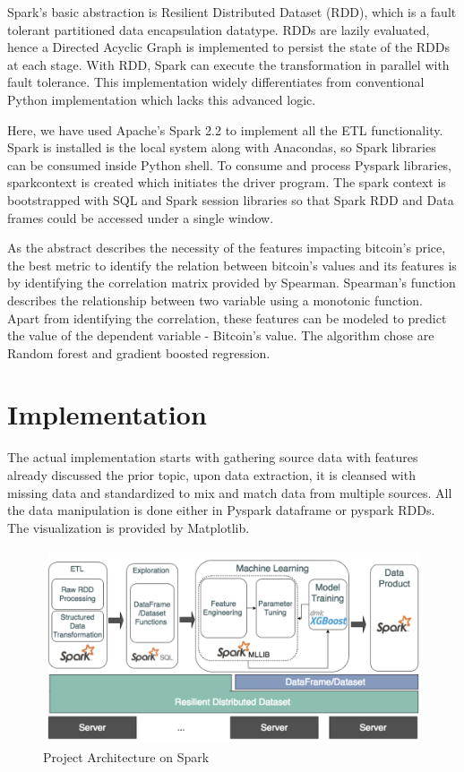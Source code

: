\documentclass[sigconf]{acmart}
\begin{document}
Spark's basic abstraction is Resilient Distributed Dataset (RDD), which is a fault tolerant partitioned data encapsulation datatype. RDDs are lazily evaluated, hence a Directed Acyclic Graph is implemented to persist the state of the RDDs at each stage. With RDD, Spark can execute the transformation in parallel with fault tolerance. This implementation widely differentiates from conventional Python implementation which lacks this advanced logic.  

Here, we have used Apache's Spark 2.2 to implement all the ETL functionality. Spark is installed is the local system along with Anacondas, so Spark libraries can be consumed inside Python shell. To consume and process Pyspark libraries, sparkcontext is created which initiates the driver program. The spark context is bootstrapped with SQL and Spark session libraries so that Spark RDD and Data frames could be accessed under a single window.

As the abstract describes the necessity of the features impacting bitcoin's price, the best metric to identify the relation between bitcoin's values and its features is by identifying the correlation matrix provided by Spearman. Spearman's function describes the relationship between two variable using a monotonic function\cite{Spearman9:online}. Apart from identifying the correlation, these features can be modeled to predict the value of the dependent variable - Bitcoin's value. The algorithm chose are Random forest and gradient boosted regression.

\section{Implementation}
The actual implementation starts with gathering source data with features already discussed the prior topic, upon data extraction, it is cleansed with missing data and standardized to mix and match data from multiple sources. All the data manipulation is done either in Pyspark dataframe or pyspark RDDs. The visualization is provided by Matplotlib.

\begin{figure}[!ht]
  \centering\includegraphics[width=\columnwidth]{images/Projectflow.png}
  \caption{Project Architecture on Spark}
  \label{Architecture:spark}
\end{figure}
\end{document}
